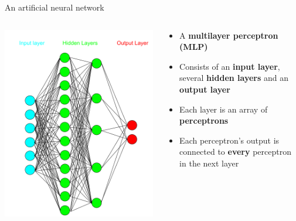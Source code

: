 \begin{frame}{An artificial neural network}
	\begin{columns}
		\begin{column}{0.48\textwidth}
			\includegraphics[width=\textwidth]{multilayer_perceptron}
		\end{column}
		\begin{column}{0.48\textwidth}
			\begin{itemize}
				\pause\item A \textbf{multilayer perceptron (MLP)}
				\pause\item Consists of an \textbf{input layer}, several \textbf{hidden layers} and an \textbf{output layer}
				\pause\item Each layer is an array of \textbf{perceptrons}
				\pause\item Each perceptron's output is connected to \textbf{every} perceptron in the next layer
			\end{itemize}
		\end{column}
	\end{columns}
\end{frame}


